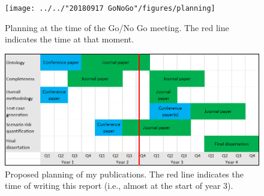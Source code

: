 \documentclass[10pt,final,a4paper,oneside,onecolumn]{article}
\begin{document}
\begin{itemize}
	\begin{figure}
		\centering
		\texttt{[image: ../../"20180917 GoNoGo"/figures/planning]}
		\caption{Planning at the time of the Go/No Go meeting. The red line indicates the time at that moment.}
		\label{fig:old planning}
	\end{figure}
	
	\begin{figure}
		\centering
		\includegraphics[width=\linewidth]{figures/planning}
		\caption{Proposed planning of my publications. The red line indicates the time of writing this report (i.e., almost at the start of year 3).}
		\label{fig:new planning}
	\end{figure}


\end{itemize}
\end{document}
